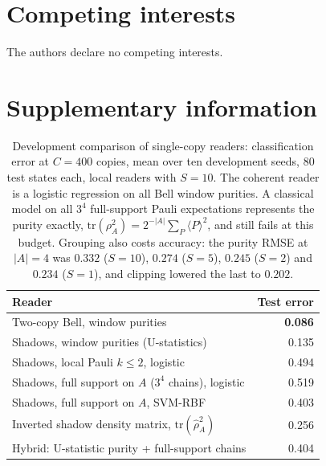 \documentclass[11pt,a4paper]{article}
\begin{document}
\section*{Competing interests}
The authors declare no competing interests.




\clearpage
\section*{Supplementary information}
\renewcommand{\thetable}{S\arabic{table}}
\setcounter{table}{0}

\begin{table}[H]
\centering
\small
\caption{Development comparison of single-copy readers: classification error at $C=400$ copies,
mean over ten development seeds, $80$ test states each, local readers with $S=10$. The coherent
reader is a logistic regression on all Bell window purities. A classical model on all $3^4$
full-support Pauli expectations represents the purity exactly,
$\mathrm{tr}(\rho_A^2)=2^{-|A|}\sum_P\langle P\rangle^2$, and still fails at this budget. Grouping
also costs accuracy: the purity RMSE at $|A|=4$ was $0.332$ ($S=10$), $0.274$ ($S=5$), $0.245$
($S=2$) and $0.234$ ($S=1$), and clipping lowered the last to $0.202$.}
\label{tab:rivals}
\begin{tabular}{lr}
\toprule
Reader & Test error \\
\midrule
Two-copy Bell, window purities & \textbf{0.086} \\
Shadows, window purities (U-statistics) & 0.135 \\
Shadows, local Pauli $k\le2$, logistic & 0.494 \\
Shadows, full support on $A$ ($3^4$ chains), logistic & 0.519 \\
Shadows, full support on $A$, SVM-RBF & 0.403 \\
Inverted shadow density matrix, $\mathrm{tr}(\hat\rho_A^2)$ & 0.256 \\
Hybrid: U-statistic purity + full-support chains & 0.404 \\
\bottomrule
\end{tabular}
\end{table}
\end{document}
